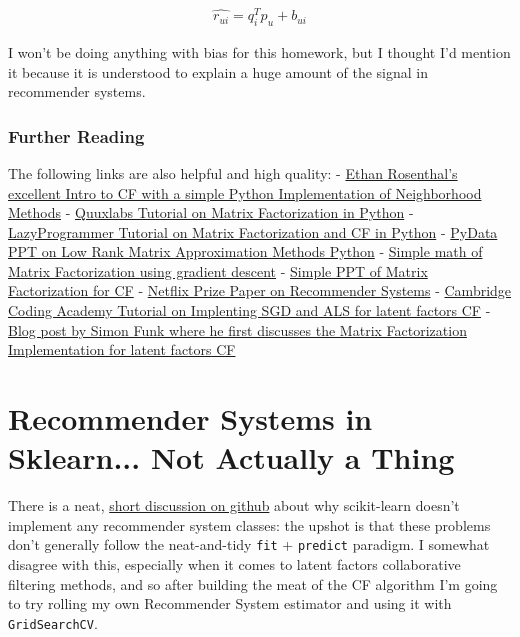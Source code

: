 \documentclass[11pt]{article}
\begin{document}
\begin{align*}
\hat{r_{ui}} = q_i^Tp_u + b_{ui}
\end{align*}

I won't be doing anything with bias for this homework, but I thought I'd
mention it because it is understood to explain a huge amount of the
signal in recommender systems.

    \subsubsection{Further Reading}\label{further-reading}

The following links are also helpful and high quality: -
\href{http://blog.ethanrosenthal.com/2015/11/02/intro-to-collaborative-filtering/}{Ethan
Rosenthal's excellent Intro to CF with a simple Python Implementation of
Neighborhood Methods} -
\href{http://www.quuxlabs.com/blog/2010/09/matrix-factorization-a-simple-tutorial-and-implementation-in-python/}{Quuxlabs
Tutorial on Matrix Factorization in Python} -
\href{https://lazyprogrammer.me/tutorial-on-collaborative-filtering-and-matrix-factorization-in-python/}{LazyProgrammer
Tutorial on Matrix Factorization and CF in Python} -
\href{http://www.slideshare.net/PyData/thurau-pydata-2014}{PyData PPT on
Low Rank Matrix Approximation Methods Python} -
\href{http://pythonhosted.org/trustedanalytics/CollaborativeFilteringNewPlugin_Summary.html}{Simple
math of Matrix Factorization using gradient descent} -
\href{http://acsweb.ucsd.edu/~dklim/mf_presentation.pdf}{Simple PPT of
Matrix Factorization for CF} -
\href{https://datajobs.com/data-science-repo/Recommender-Systems-\%5BNetflix\%5D.pdf}{Netflix
Prize Paper on Recommender Systems} -
\href{http://online.cambridgecoding.com/notebooks/mhaller/implementing-your-own-recommender-systems-in-python-using-stochastic-gradient-descent-4}{Cambridge
Coding Academy Tutorial on Implenting SGD and ALS for latent factors CF}
- \href{http://sifter.org/~simon/journal/20061211.html}{Blog post by
Simon Funk where he first discusses the Matrix Factorization
Implementation for latent factors CF}

    \section{Recommender Systems in Sklearn... Not Actually a
Thing}\label{recommender-systems-in-sklearn...-not-actually-a-thing}

There is a neat,
\href{https://github.com/scikit-learn/scikit-learn/issues/6142}{short
discussion on github} about why scikit-learn doesn't implement any
recommender system classes: the upshot is that these problems don't
generally follow the neat-and-tidy \texttt{fit} + \texttt{predict}
paradigm. I somewhat disagree with this, especially when it comes to
latent factors collaborative filtering methods, and so after building
the meat of the CF algorithm I'm going to try rolling my own Recommender
System estimator and using it with \texttt{GridSearchCV}.
\end{document}
